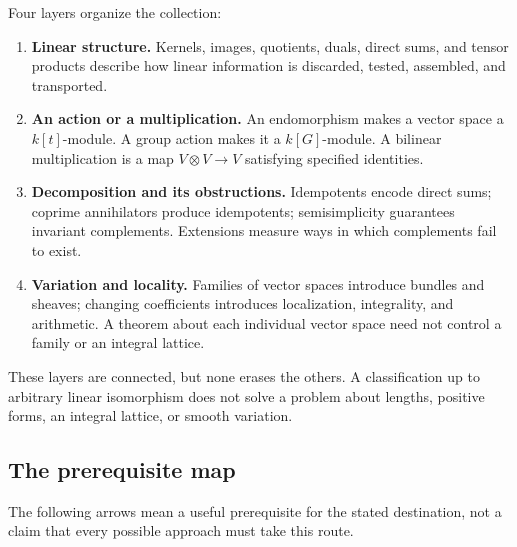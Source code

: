 \documentclass[
  11pt,
]{article}
\providecommand{\tightlist}{%
  \setlength{\itemsep}{0pt}\setlength{\parskip}{0pt}}
\begin{document}
Four layers organize the collection:

\begin{enumerate}
\def\labelenumi{\arabic{enumi}.}
\tightlist
\item
  \textbf{Linear structure.} Kernels, images, quotients, duals, direct
  sums, and tensor products describe how linear information is
  discarded, tested, assembled, and transported.
\item
  \textbf{An action or a multiplication.} An endomorphism makes a vector
  space a \(k[t]\)-module. A group action makes it a \(k[G]\)-module. A
  bilinear multiplication is a map \(V\otimes V\to V\) satisfying
  specified identities.
\item
  \textbf{Decomposition and its obstructions.} Idempotents encode direct
  sums; coprime annihilators produce idempotents; semisimplicity
  guarantees invariant complements. Extensions measure ways in which
  complements fail to exist.
\item
  \textbf{Variation and locality.} Families of vector spaces introduce
  bundles and sheaves; changing coefficients introduces localization,
  integrality, and arithmetic. A theorem about each individual vector
  space need not control a family or an integral lattice.
\end{enumerate}

These layers are connected, but none erases the others. A classification
up to arbitrary linear isomorphism does not solve a problem about
lengths, positive forms, an integral lattice, or smooth variation.

\subsection*{The prerequisite map}\label{the-prerequisite-map}

The following arrows mean a useful prerequisite for the stated
destination, not a claim that every possible approach must take this
route.
\end{document}

